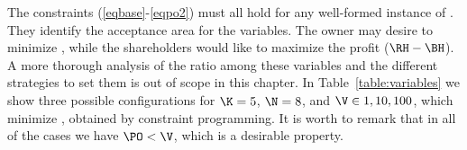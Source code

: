 The constraints (\ref{eqbase}-\ref{eqpo2}) must all hold for any well-formed instance of \shortname. 
They identify the acceptance area for the variables. 
The owner may desire to minimize \PO, while the shareholders would like to maximize the profit ($\RH - \BH$).
A more thorough analysis of the ratio among these variables and the different strategies to set them is out of scope in this chapter.
In Table~\ref{table:variables} we show three possible configurations for $\K=5$, $\N=8$, and $\V \in {1, 10, 100}$, which minimize \PO, obtained by constraint programming.
It is worth to remark that in all of the cases we have $\PO < \V$, which is a desirable property.


